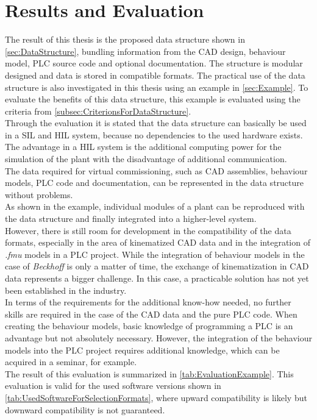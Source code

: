 \chapter{Results and Evaluation} \label{sec:ResultsAndEvaluation}
    The result of this thesis is the proposed data structure shown in \autoref{sec:DataStructure}, bundling information from the CAD design, behaviour model, PLC source code and optional documentation. The structure is modular designed and data is stored in compatible formats. 
    The practical use of the data structure is also investigated in this thesis using an example in \autoref{sec:Example}. To evaluate the benefits of this data structure, this example is evaluated using the criteria from \autoref{subsec:CriterionsForDataStructure}.\\
   
    Through the evaluation it is stated that the data structure can basically be used in a SIL and HIL system, because no dependencies to the used hardware exists. The advantage in a HIL system is the additional computing power for the simulation of the plant with the disadvantage of additional communication. \\
    The data required for virtual commissioning, such as CAD assemblies, behaviour models, PLC code and documentation, can be represented in the data structure without problems.\\
    As shown in the example, individual modules of a plant can be reproduced with the data structure and finally integrated into a higher-level system. \\
    However, there is still room for development in the compatibility of the data formats, especially in the area of kinematized CAD data and in the integration of \textit{.fmu} models in a PLC project. While the integration of behaviour models in the case of \textit{Beckhoff} is only a matter of time, the exchange of kinematization in CAD data represents a bigger challenge. In this case, a practicable solution has not yet been established in the industry. \\
    In terms of the requirements for the additional know-how needed, no further skills are required in the case of the CAD data and the pure PLC code. When creating the behaviour models, basic knowledge of programming a PLC is an advantage but not absolutely necessary. However, the integration of the behaviour models into the PLC project requires additional knowledge, which can be acquired in a seminar, for example. \\
    The result of this evaluation is summarized in \autoref{tab:EvaluationExample}. This evaluation is valid for the used software versions shown in \autoref{tab:UsedSoftwareForSelectionFormats}, where upward compatibility is likely but downward compatibility is not guaranteed. 
